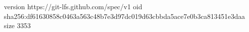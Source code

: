 version https://git-lfs.github.com/spec/v1
oid sha256:df61630858c0463a563c48b7e3d97dc019d63cbbda5ace7e0b3ca813451e3daa
size 3353
